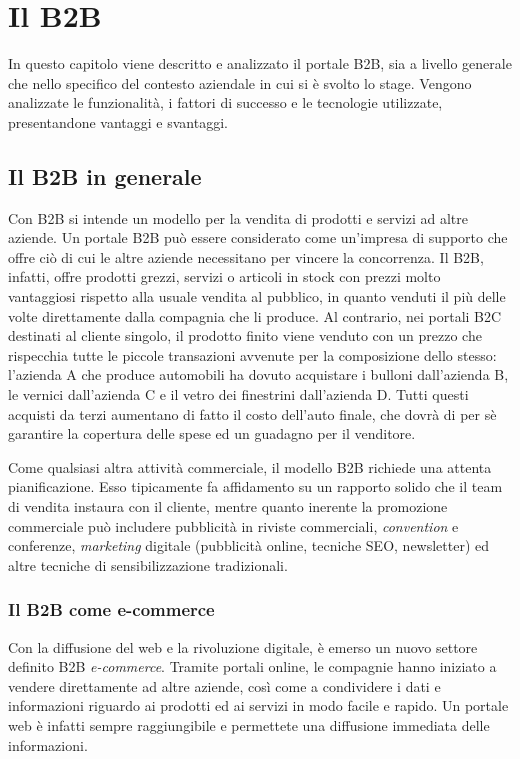 \chapter{Il B2B}
\begin{flushright}
	\parbox{13cm}{\small In questo capitolo viene descritto e analizzato il portale B2B, sia a livello generale che nello specifico del contesto aziendale in cui si è svolto lo stage. Vengono analizzate le funzionalità, i fattori di successo e le tecnologie utilizzate, presentandone vantaggi e svantaggi.}
\end{flushright}
\section{Il B2B in generale}
Con B2B si intende un modello per la vendita di prodotti e servizi ad altre aziende. Un portale B2B può essere considerato come un'impresa di supporto che offre ciò di cui le altre aziende necessitano per vincere la concorrenza. Il B2B, infatti, offre prodotti grezzi, servizi o articoli in stock con prezzi molto vantaggiosi rispetto alla usuale vendita al pubblico, in quanto venduti il più delle volte direttamente dalla compagnia che li produce. Al contrario, nei portali B2C destinati al cliente singolo, il prodotto finito viene venduto con un prezzo che rispecchia tutte le piccole transazioni avvenute per la composizione dello stesso: l'azienda A che produce automobili ha dovuto acquistare i bulloni dall'azienda B, le vernici dall'azienda C e il vetro dei finestrini dall'azienda D. Tutti questi acquisti da terzi aumentano di fatto il costo dell'auto finale, che dovrà di per sè garantire la copertura delle spese ed un guadagno per il venditore.

Come qualsiasi altra attività commerciale, il modello B2B richiede una attenta pianificazione. Esso tipicamente fa affidamento su un rapporto solido che il team di vendita instaura con il cliente, mentre quanto inerente la promozione commerciale può includere pubblicità in riviste commerciali, \textit{convention} e conferenze, \textit{marketing} digitale (pubblicità online, tecniche SEO, newsletter) ed altre tecniche di sensibilizzazione tradizionali.

\subsection{Il B2B come e-commerce}
Con la diffusione del web e la rivoluzione digitale, è emerso un nuovo settore definito B2B \textit{e-commerce}. Tramite portali online, le compagnie hanno iniziato a vendere direttamente ad altre aziende, così come a condividere i dati e informazioni riguardo ai prodotti ed ai servizi in modo facile e rapido. Un portale web è infatti sempre raggiungibile e permettete una diffusione immediata
delle informazioni.

